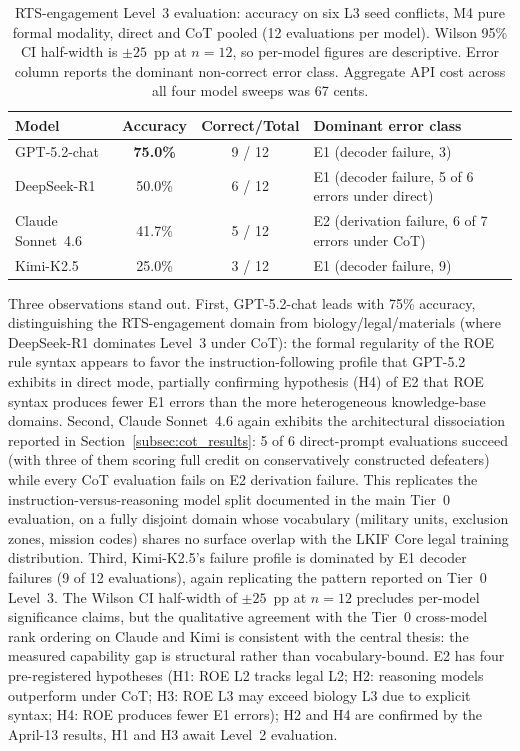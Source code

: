 \documentclass{article}
\theoremstyle{definition}
\begin{document}
\begin{table}[h]
\centering
\caption{RTS-engagement Level~3 evaluation: accuracy on six L3 seed conflicts, M4 pure formal modality, direct and CoT pooled (12 evaluations per model). Wilson 95\% CI half-width is $\pm 25$~pp at $n = 12$, so per-model figures are descriptive. Error column reports the dominant non-correct error class. Aggregate API cost across all four model sweeps was 67 cents.}
\label{tab:rts_eval}
\small
\begin{tabular}{@{}lccl@{}}
\toprule
Model & Accuracy & Correct/Total & Dominant error class \\
\midrule
GPT-5.2-chat        & \textbf{75.0\%} & 9 / 12 & E1 (decoder failure, 3) \\
DeepSeek-R1         & 50.0\% & 6 / 12 & E1 (decoder failure, 5 of 6 errors under direct) \\
Claude Sonnet~4.6   & 41.7\% & 5 / 12 & E2 (derivation failure, 6 of 7 errors under CoT) \\
Kimi-K2.5           & 25.0\% & 3 / 12 & E1 (decoder failure, 9) \\
\bottomrule
\end{tabular}
\end{table}

Three observations stand out. First, GPT-5.2-chat leads with 75\% accuracy, distinguishing the RTS-engagement domain from biology/legal/materials (where DeepSeek-R1 dominates Level~3 under CoT): the formal regularity of the ROE rule syntax appears to favor the instruction-following profile that GPT-5.2 exhibits in direct mode, partially confirming hypothesis (H4) of E2 that ROE syntax produces fewer E1 errors than the more heterogeneous knowledge-base domains. Second, Claude Sonnet~4.6 again exhibits the architectural dissociation reported in Section~\ref{subsec:cot_results}: 5 of 6 direct-prompt evaluations succeed (with three of them scoring full credit on conservatively constructed defeaters) while every CoT evaluation fails on E2 derivation failure. This replicates the instruction-versus-reasoning model split documented in the main Tier~0 evaluation, on a fully disjoint domain whose vocabulary (military units, exclusion zones, mission codes) shares no surface overlap with the LKIF Core legal training distribution. Third, Kimi-K2.5's failure profile is dominated by E1 decoder failures (9 of 12 evaluations), again replicating the pattern reported on Tier~0 Level~3. The Wilson CI half-width of $\pm 25$~pp at $n = 12$ precludes per-model significance claims, but the qualitative agreement with the Tier~0 cross-model rank ordering on Claude and Kimi is consistent with the central thesis: the measured capability gap is structural rather than vocabulary-bound. E2 has four pre-registered hypotheses (H1: ROE L2 tracks legal L2; H2: reasoning models outperform under CoT; H3: ROE L3 may exceed biology L3 due to explicit syntax; H4: ROE produces fewer E1 errors); H2 and H4 are confirmed by the April-13 results, H1 and H3 await Level~2 evaluation.
\end{document}
